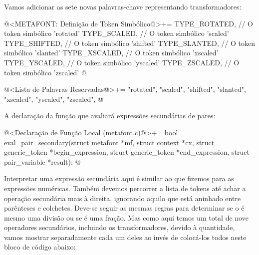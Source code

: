 Vamos adicionar as sete novas palavras-chave representando
transformadores:

\iniciocodigo
@<METAFONT: Definição de Token Simbólico@>+=
TYPE_ROTATED,  // O token simbólico 'rotated'
TYPE_SCALED,   // O token simbólico 'scaled'
TYPE_SHIFTED,  // O token simbólico 'shifted'
TYPE_SLANTED,  // O token simbólico 'slanted'
TYPE_XSCALED,  // O token simbólico 'xscaled'
TYPE_YSCALED,  // O token simbólico 'yscaled'
TYPE_ZSCALED,  // O token simbólico 'zscaled'
@
\fimcodigo

\iniciocodigo
@<Lista de Palavras Reservadas@>+=
"rotated", "scaled", "shifted", "slanted", "xscaled", "yscaled",
"zscaled",
@
\fimcodigo

A declaração da função que avaliará expressões secundárias de pares:

\iniciocodigo
@<Declaração de Função Local (metafont.c)@>+=
bool eval_pair_secondary(struct metafont *mf, struct context *cx,
                         struct generic_token *begin_expression,
                         struct generic_token *end_expression,
                         struct pair_variable *result);
@
\fimcodigo


Interpretar uma expressão secundária aqui é similar ao que fizemos
para as expressões numéricas. Também devemos percorrer a lista de
tokens até achar a operação secundária mais à direita, ignorando
aquilo que está aninhado entre parênteses e colchetes. Deve-se seguir
as mesmas regras para determinar se o \monoespaco{/} é mesmo uma
divisão ou se é uma fração. Mas como aqui temos um total de nove
operadores secundários, incluindo os transformadores, devido à
quantidade, vamos mostrar separadamente cada um deles ao invés de
colocá-los todos neste bloco de código abaixo:

